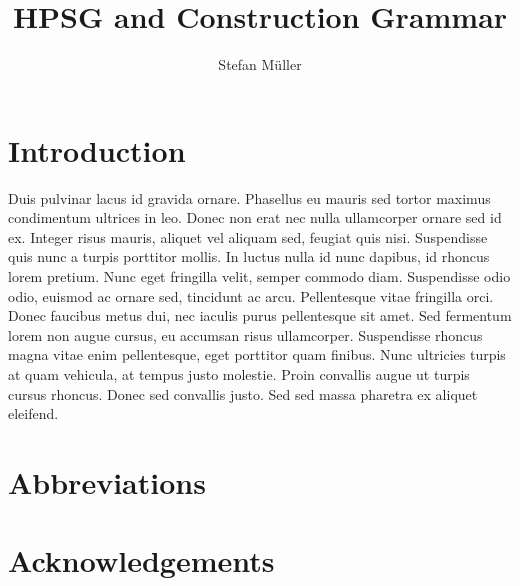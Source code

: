 \documentclass[output=paper]{langsci/langscibook}
\author{Stefan Müller\affiliation{Humboldt-Universität zu Berlin}}
\title{HPSG and Construction Grammar}
\begin{document}
\section{Introduction} 
Duis pulvinar lacus id gravida ornare. Phasellus eu mauris sed tortor maximus condimentum ultrices in leo. Donec non erat nec nulla ullamcorper ornare sed id ex. Integer risus mauris, aliquet vel aliquam sed, feugiat quis nisi. Suspendisse quis nunc a turpis porttitor mollis. In luctus nulla id nunc dapibus, id rhoncus lorem pretium. Nunc eget fringilla velit, semper commodo diam. Suspendisse odio odio, euismod ac ornare sed, tincidunt ac arcu. Pellentesque vitae fringilla orci. Donec faucibus metus dui, nec iaculis purus pellentesque sit amet. Sed fermentum lorem non augue cursus, eu accumsan risus ullamcorper. Suspendisse rhoncus magna vitae enim pellentesque, eget porttitor quam finibus. Nunc ultricies turpis at quam vehicula, at tempus justo molestie. Proin convallis augue ut turpis cursus rhoncus. Donec sed convallis justo. Sed sed massa pharetra ex aliquet eleifend. 

 
\section*{Abbreviations}
\section*{Acknowledgements}

\printbibliography[heading=subbibliography,notkeyword=this] 
\end{document}
